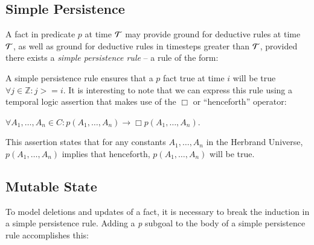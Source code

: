 \subsection{Simple Persistence}

A fact in predicate $p$ at time $\Tau$ may provide ground for deductive rules
at time $\Tau$, as well as ground for deductive rules in timesteps greater than $\Tau$,
provided there exists a {\em simple persistence rule} -- a rule of the form:




A simple persistence rule ensures that a $p$ fact true at time $i$ will be true
$\forall j \in \mathbb{Z} : j >= i$.  It is interesting to note that we can
express this rule using a temporal logic assertion that makes use of the $\Box$
or ``henceforth'' operator:

$\forall A_1, \ldots, A_n \in C : p$\pos$(A_1, \ldots, A_n) \to \Box p$\pos$(A_1,
\ldots, A_n)$.

This assertion states that for any constants $A_1, \ldots, A_n$ in the Herbrand
Universe, $p$\pos$(A_1, \ldots, A_n)$ implies that henceforth, \linebreak
$p$\pos$(A_1, \ldots, A_n)$ will be true.

\subsection{Mutable State}
\label{sec:mutable}

To model deletions and updates of a fact, it is necessary to break the induction
in a simple persistence rule.  Adding a {\em p\nega} subgoal to the body of a
simple persistence rule accomplishes this:

